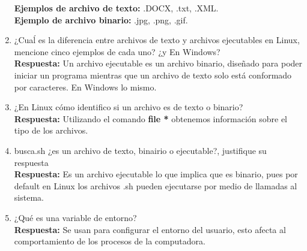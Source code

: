 \documentclass[a4paper, 11pt, oneside]{article}
\begin{document}
\begin{enumerate}
    \textbf{Ejemplos de archivo de texto:} .DOCX, .txt, .XML.\\
    \textbf{Ejemplo de archivo binario:}  .jpg, .png, .gif.


    \item ¿Cuaĺ es la diferencia entre archivos de texto y archivos ejecutables en Linux,
    mencione cinco ejemplos de cada uno? ¿y En Windows?\\
    \textbf{Respuesta:} Un archivo ejecutable es un archivo binario, diseñado para poder iniciar un programa mientras que un archivo de texto solo está conformado por caracteres. En Windows lo mismo.

    \item ¿En Linux cómo identifico si un archivo es de texto o binario?\\
    \textbf{Respuesta:} Utilizando el comando \textbf{file *} obtenemos información sobre el tipo de los archivos.
    
    \item busca.sh ¿es un archivo de texto, binairio o ejecutable?, justifique su respuesta\\
    \textbf{Respuesta:} Es un archivo ejecutable lo que implica que es binario, pues por default en Linux los archivos .sh pueden ejecutarse por medio de llamadas al sistema.
    
    \item ¿Qué es una variable de entorno?\\
    \textbf{Respuesta:} Se usan para configurar el entorno del usuario, esto afecta al comportamiento de los procesos de la computadora.
    

\end{enumerate}
\end{document}
